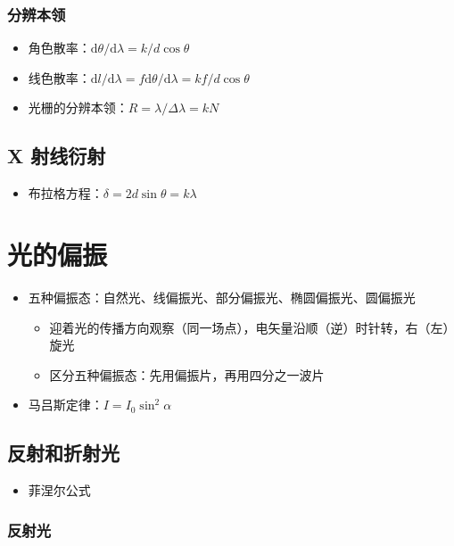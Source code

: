 \documentclass{article}
\begin{document}
\subsubsection{分辨本领}

\begin{itemize}
    \item 角色散率：$\mathrm{d}\theta/\mathrm{d}\lambda=k/d\cos\theta$
    \item 线色散率：$\mathrm{d}l/\mathrm{d}\lambda=f\mathrm{d}\theta/\mathrm{d}\lambda=kf/d\cos\theta$
    \item 光栅的分辨本领：$R=\lambda/\Delta\lambda=kN$
\end{itemize}

\subsection{X 射线衍射}

\begin{itemize}
    \item 布拉格方程：$\delta=2d\sin\theta=k\lambda$
\end{itemize}

\section{光的偏振}

\begin{itemize}
    \item 五种偏振态：自然光、线偏振光、部分偏振光、椭圆偏振光、圆偏振光 \begin{itemize}
              \item 迎着光的传播方向观察（同一场点），电矢量沿顺（逆）时针转，右（左）旋光
              \item 区分五种偏振态：先用偏振片，再用四分之一波片
          \end{itemize}
    \item 马吕斯定律：$I=I_0\sin^2\alpha$
\end{itemize}

\subsection{反射和折射光}

\begin{itemize}
    \item 菲涅尔公式
\end{itemize}

\subsubsection{反射光}
\end{document}
